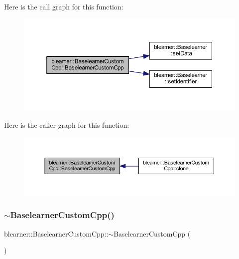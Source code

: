 Here is the call graph for this function\+:
\nopagebreak
\begin{figure}[H]
\begin{center}
\leavevmode
\includegraphics[width=350pt]{classblearner_1_1_baselearner_custom_cpp_a7714c44164d0f763a861217ff2d53480_cgraph}
\end{center}
\end{figure}
Here is the caller graph for this function\+:
\nopagebreak
\begin{figure}[H]
\begin{center}
\leavevmode
\includegraphics[width=350pt]{classblearner_1_1_baselearner_custom_cpp_a7714c44164d0f763a861217ff2d53480_icgraph}
\end{center}
\end{figure}
\mbox{\label{classblearner_1_1_baselearner_custom_cpp_a67aa938d71013c6e931d3edc563935bb}} 
\subsubsection{\texorpdfstring{$\sim$\+Baselearner\+Custom\+Cpp()}{~BaselearnerCustomCpp()}}
{\footnotesize\ttfamily blearner\+::\+Baselearner\+Custom\+Cpp\+::$\sim$\+Baselearner\+Custom\+Cpp (\begin{DoxyParamCaption}{ }\end{DoxyParamCaption})}



